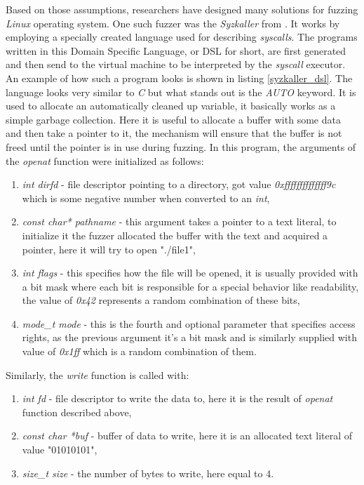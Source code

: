 Based on those assumptions, researchers have designed many solutions for fuzzing \textit{Linux} operating system. One such fuzzer was the \textit{Syzkaller} from \cite{syzkaller}. It works by employing a specially created language used for describing \textit{syscalls}. The programs written in this Domain Specific Language, or DSL for short, are first generated and then send to the virtual machine to be interpreted by the \textit{syscall} executor. An example of how such a program looks is shown in listing \ref{syzkaller_dsl}. The language looks very similar to \textit{C} but what stands out is the \textit{AUTO} keyword. It is used to allocate an automatically cleaned up variable, it basically works as a simple garbage collection. Here it is useful to allocate a buffer with some data and then take a pointer to it, the mechanism will ensure that the buffer is not freed until the pointer is in use during fuzzing. In this program, the arguments of the \textit{openat} function were initialized as follows:
\begin{enumerate}
    \item \textit{int dirfd} - file descriptor pointing to a directory, got value \textit{0xffffffffffffff9c} which is some negative number when converted to an \textit{int},
    \item \textit{const char* pathname} - this argument takes a pointer to a text literal, to initialize it the fuzzer allocated the buffer with the text and acquired a pointer, here it will try to open "./file1",
    \item \textit{int flags} - this specifies how the file will be opened, it is usually provided with a bit mask where each bit is responsible for a special behavior like readability, the value of \textit{0x42} represents a random combination of these bits,
    \item \textit{mode\_t mode} - this is the fourth and optional parameter that specifies access rights, as the previous argument it's a bit mask and is similarly supplied with value of \textit{0x1ff} which is a random combination of them.
\end{enumerate}
Similarly, the \textit{write} function is called with:
\begin{enumerate}
    \item \textit{int fd} - file descriptor to write the data to, here it is the result of \textit{openat} function described above,
    \item \textit{const char *buf} - buffer of data to write, here it is an allocated text literal of value "01010101",
    \item \textit{size\_t size} - the number of bytes to write, here equal to 4.
\end{enumerate}

